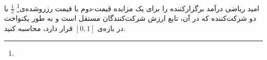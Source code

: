 امید ریاضی درآمد برگزار‌کننده را برای یک مزایده قیمت-دوم با قیمت رزروشده‌ی\footnote{}
$\frac{1}{2}$
با دو شرکت‌کننده که در آن، تابع ارزش شرکت‌کنندگان مستقل است و به طور یکنواخت در بازه‌ی $[0,1]$ قرار دارد، محاسبه کنید.
